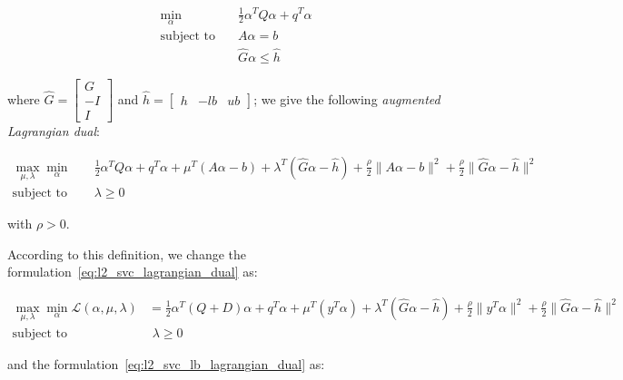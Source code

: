 \begin{equation}
    \begin{aligned}
        \min_{\alpha} \quad & \frac{1}{2} \alpha^T Q \alpha + q^T \alpha \\
            \textrm{subject to} \quad & A \alpha = b \\ & \hat{G} \alpha \leq \hat{h}
    \end{aligned}
\end{equation}

where $\hat{G} =
\begin{bmatrix}
 G \\
-I \\
 I 
\end{bmatrix}$ and $\hat{h} =
\begin{bmatrix}
h & -lb & ub
\end{bmatrix}$; we give the following \emph{augmented Lagrangian dual}:

\begin{equation} \label{eq:l2_svc_gen_aug_lagrangian_dual}
	\begin{aligned}
		    \max_{\mu,\lambda} \min_{\alpha} \quad & \frac{1}{2} \alpha^T Q \alpha + q^T \alpha + \mu^T (A \alpha - b) + \lambda^T (\hat{G} \alpha - \hat{h}) + \frac{\rho}{2} \| A \alpha - b \|^2 + \frac{\rho}{2} \| \hat{G} \alpha - \hat{h} \|^2 \\
    \text{subject to} \quad & \lambda \geq 0
	\end{aligned}
\end{equation}

with $\rho > 0$.

\bigskip

According to this definition, we change the formulation~\ref{eq:l2_svc_lagrangian_dual} as:

\begin{equation} \label{eq:l2_svc_aug_lagrangian_dual}
	\begin{aligned}
		    \max_{\mu,\lambda} \min_{\alpha} \mathcal{L}(\alpha,\mu,\lambda) &= \frac{1}{2} \alpha^T (Q + D) \alpha+q^T\alpha + \mu^T (y^T \alpha) + \lambda^T (\hat{G} \alpha - \hat{h}) + \frac{\rho}{2} \| y^T \alpha \|^2 + \frac{\rho}{2} \| \hat{G} \alpha - \hat{h} \|^2 \\
    \text{subject to} \quad & \,\, \lambda \geq 0
	\end{aligned}
\end{equation}

and the formulation~\ref{eq:l2_svc_lb_lagrangian_dual} as:

